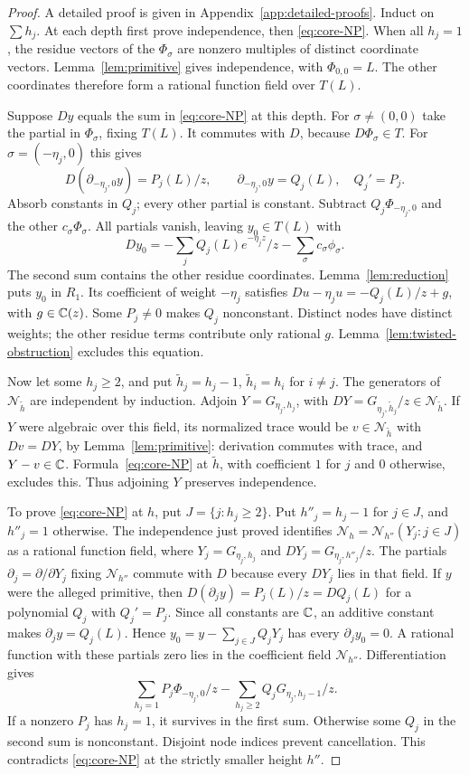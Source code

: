 \begin{proof}
A detailed proof is given in Appendix~\ref{app:detailed-proofs}.
Induct on $\sum h_j$. At each depth first prove independence, then
\eqref{eq:core-NP}. When all $h_j=1$, the residue vectors of the
$\Phi_\sigma$ are nonzero multiples of distinct coordinate vectors.
Lemma~\ref{lem:primitive} gives independence, with $\Phi_{0,0}=L$.
The other coordinates therefore form a rational function field over $T(L)$.

Suppose $Dy$ equals the sum in \eqref{eq:core-NP} at this depth.
For $\sigma\ne(0,0)$ take the partial in $\Phi_\sigma$, fixing $T(L)$.
It commutes with $D$, because $D\Phi_\sigma\in T$.
For $\sigma=(-\eta_j,0)$ this gives
\[
 D(\partial_{-\eta_j,0}y)=P_j(L)/z,
 \qquad \partial_{-\eta_j,0}y=Q_j(L),\quad Q_j'=P_j.
\]
Absorb constants in $Q_j$; every other partial is constant.
Subtract $Q_j\Phi_{-\eta_j,0}$ and the other $c_\sigma\Phi_\sigma$.
All partials vanish, leaving
$y_0\in T(L)$ with
\[
 Dy_0=-\sum_jQ_j(L)e^{-\eta_jz}/z-\sum_{\sigma}c_\sigma\phi_\sigma.
\]
The second sum contains the other residue coordinates.
Lemma~\ref{lem:reduction} puts $y_0$ in $R_1$.
Its coefficient of weight $-\eta_j$ satisfies
$Du-\eta_ju=-Q_j(L)/z+g$, with $g\in\mathbb{C}(z)$.
Some $P_j\ne0$ makes $Q_j$ nonconstant. Distinct nodes have distinct
weights; the other residue terms contribute only rational $g$.
Lemma~\ref{lem:twisted-obstruction} excludes this equation.

Now let some $h_j\ge2$, and put $\widetilde h_j=h_j-1$,
$\widetilde h_i=h_i$ for $i\ne j$.
The generators of $\mathcal N_{\widetilde h}$ are independent by induction.
Adjoin $Y=G_{\eta_j,h_j}$, with
$DY=G_{\eta_j,\widetilde h_j}/z\in\mathcal N_{\widetilde h}$.
If $Y$ were algebraic over this field, its normalized trace would be
$v\in\mathcal N_{\widetilde h}$ with $Dv=DY$, by
Lemma~\ref{lem:primitive}: derivation commutes with trace, and $Y-v\in\mathbb{C}$.
Formula~\eqref{eq:core-NP} at
$\widetilde h$, with coefficient $1$ for $j$ and $0$ otherwise,
excludes this. Thus adjoining $Y$ preserves independence.

To prove \eqref{eq:core-NP} at $h$, put $J=\{j:h_j\ge2\}$.
Put $h''_j=h_j-1$ for $j\in J$, and $h''_j=1$ otherwise.
The independence just proved identifies
$\mathcal N_h=\mathcal N_{h''}(Y_j:j\in J)$ as a rational function field,
where $Y_j=G_{\eta_j,h_j}$ and $DY_j=G_{\eta_j,h''_j}/z$.
The partials $\partial_j=\partial/\partial Y_j$ fixing
$\mathcal N_{h''}$ commute with $D$ because every $DY_j$ lies in that field.
If $y$ were the alleged primitive, then
$D(\partial_jy)=P_j(L)/z=DQ_j(L)$ for a polynomial $Q_j$ with
$Q_j'=P_j$. Since all constants are $\mathbb{C}$, an additive constant makes
$\partial_jy=Q_j(L)$. Hence
$y_0=y-\sum_{j\in J}Q_jY_j$ has every $\partial_jy_0=0$.
A rational function with these partials zero lies in the coefficient
field $\mathcal N_{h''}$. Differentiation gives
\[
\sum_{h_j=1}P_j\Phi_{-\eta_j,0}/z-
\sum_{h_j\ge2}Q_jG_{\eta_j,h_j-1}/z.
\]
If a nonzero $P_j$ has $h_j=1$, it survives in the first sum.
Otherwise some $Q_j$ in the second sum is nonconstant.
Disjoint node indices prevent cancellation. This contradicts
\eqref{eq:core-NP} at the strictly smaller height $h''$.


\end{proof}
